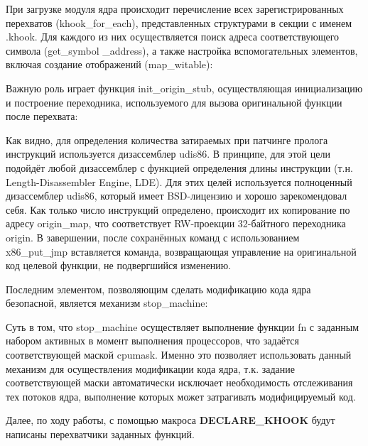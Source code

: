 При загрузке модуля ядра происходит перечисление всех зарегистрированных перехватов (khook\_for\_each), представленных структурами в секции с именем .khook. Для каждого из них осуществляется поиск адреса соответствующего символа (get\_symbol \_address), а также настройка вспомогательных элементов, включая создание отображений (map\_witable):

Важную роль играет функция init\_origin\_stub, осуществляющая инициализацию и построение переходника, используемого для вызова оригинальной функции после перехвата:

Как видно, для определения количества затираемых при патчинге пролога инструкций используется дизассемблер udis86. В принципе, для этой цели подойдёт любой дизассемблер с функцией определения длины инструкции (т.н. Length-Disassembler Engine, LDE). Для этих целей используется полноценный дизассемблер udis86, который имеет BSD-лицензию и хорошо зарекомендовал себя. Как только число инструкций определено, происходит их копирование по адресу origin\_map, что соответствует RW-проекции 32-байтного переходника origin. В завершении, после сохранённых команд с использованием x86\_put\_jmp вставляется команда, возвращающая управление на оригинальной код целевой функции, не подвергшийся изменению.

Последним элементом, позволяющим сделать модификацию кода ядра безопасной, является механизм stop\_machine:

Суть в том, что stop\_machine осуществляет выполнение функции fn с заданным набором активных в момент выполнения процессоров, что задаётся соответствующей маской cpumask. Именно это позволяет использовать данный механизм для осуществления модификации кода ядра, т.к. задание соответствующей маски автоматически исключает необходимость отслеживания тех потоков ядра, выполнение которых может затрагивать модифицируемый код.

Далее, по ходу работы, с помощью макроса \textbf{DECLARE\_KHOOK} будут написаны перехватчики заданных функций.



